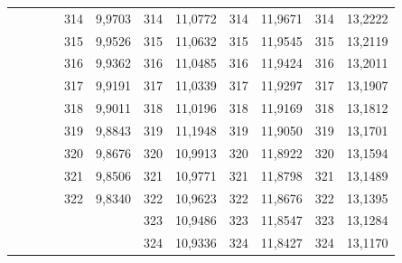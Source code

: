\documentclass[a4paper,12pt]{article} %
\begin{document}
\begin{longtable}[c]{cccccccccc|c|c|}
	&  &  & \multicolumn{1}{c|}{} & \multicolumn{1}{c|}{314} & \multicolumn{1}{c|}{9,9703} & \multicolumn{1}{c|}{314} & \multicolumn{1}{c|}{11,0772} & \multicolumn{1}{c|}{314} & 11,9671 & 314 & 13,2222 \\ \cline{5-12} 
	&  &  & \multicolumn{1}{c|}{} & \multicolumn{1}{c|}{315} & \multicolumn{1}{c|}{9,9526} & \multicolumn{1}{c|}{315} & \multicolumn{1}{c|}{11,0632} & \multicolumn{1}{c|}{315} & 11,9545 & 315 & 13,2119 \\ \cline{5-12} 
	&  &  & \multicolumn{1}{c|}{} & \multicolumn{1}{c|}{316} & \multicolumn{1}{c|}{9,9362} & \multicolumn{1}{c|}{316} & \multicolumn{1}{c|}{11,0485} & \multicolumn{1}{c|}{316} & 11,9424 & 316 & 13,2011 \\ \cline{5-12} 
	&  &  & \multicolumn{1}{c|}{} & \multicolumn{1}{c|}{317} & \multicolumn{1}{c|}{9,9191} & \multicolumn{1}{c|}{317} & \multicolumn{1}{c|}{11,0339} & \multicolumn{1}{c|}{317} & 11,9297 & 317 & 13,1907 \\ \cline{5-12} 
	&  &  & \multicolumn{1}{c|}{} & \multicolumn{1}{c|}{318} & \multicolumn{1}{c|}{9,9011} & \multicolumn{1}{c|}{318} & \multicolumn{1}{c|}{11,0196} & \multicolumn{1}{c|}{318} & 11,9169 & 318 & 13,1812 \\ \cline{5-12} 
	&  &  & \multicolumn{1}{c|}{} & \multicolumn{1}{c|}{319} & \multicolumn{1}{c|}{9,8843} & \multicolumn{1}{c|}{319} & \multicolumn{1}{c|}{11,1948} & \multicolumn{1}{c|}{319} & 11,9050 & 319 & 13,1701 \\ \cline{5-12} 
	&  &  & \multicolumn{1}{c|}{} & \multicolumn{1}{c|}{320} & \multicolumn{1}{c|}{9,8676} & \multicolumn{1}{c|}{320} & \multicolumn{1}{c|}{10,9913} & \multicolumn{1}{c|}{320} & 11,8922 & 320 & 13,1594 \\ \cline{5-12} 
	&  &  & \multicolumn{1}{c|}{} & \multicolumn{1}{c|}{321} & \multicolumn{1}{c|}{9,8506} & \multicolumn{1}{c|}{321} & \multicolumn{1}{c|}{10,9771} & \multicolumn{1}{c|}{321} & 11,8798 & 321 & 13,1489 \\ \cline{5-12} 
	&  &  & \multicolumn{1}{c|}{} & \multicolumn{1}{c|}{322} & \multicolumn{1}{c|}{9,8340} & \multicolumn{1}{c|}{322} & \multicolumn{1}{c|}{10,9623} & \multicolumn{1}{c|}{322} & 11,8676 & 322 & 13,1395 \\ \cline{5-12} 
	&  &  &  &  & \multicolumn{1}{c|}{} & \multicolumn{1}{c|}{323} & \multicolumn{1}{c|}{10,9486} & \multicolumn{1}{c|}{323} & 11,8547 & 323 & 13,1284 \\ \cline{7-12} 
	&  &  &  &  & \multicolumn{1}{c|}{} & \multicolumn{1}{c|}{324} & \multicolumn{1}{c|}{10,9336} & \multicolumn{1}{c|}{324} & 11,8427 & 324 & 13,1170 \\ \cline{7-12} 

\end{longtable}
\end{document}
